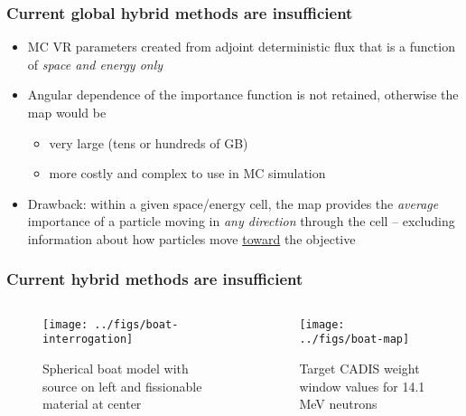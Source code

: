 \documentclass[xcolor=x11names,compress]{beamer}
\renewcommand{\(}{\begin{columns}}
\renewcommand{\)}{\end{columns}}
\newcommand{\<}[1]{\begin{column}{#1}}
\renewcommand{\>}{\end{column}}
\begin{document}
\begin{frame}[fragile]
  \frametitle{Current global hybrid methods are insufficient}

	\begin{itemize}
	\item MC VR parameters created from adjoint deterministic flux that is a function of \emph{space and energy only}
	\item Angular dependence of the importance function is not retained, otherwise the map would be
	  \begin{itemize}
	  \item very large (tens or hundreds of GB)
	  \item more costly and complex to use in MC simulation
      \end{itemize}	   
	\item Drawback: within a given space/energy cell, the map provides the \emph{average} importance of a particle moving in \emph{any direction} through the cell -- excluding information about how particles move \underline{toward} the objective
	\end{itemize}

\end{frame}

\begin{frame}[fragile]
  \frametitle{Current hybrid methods are insufficient}

	\begin{columns}
  	\begin{column}{0.5\textwidth}
 	 \begin{center}
 	 \begin{figure}
 	 \texttt{[image: ../figs/boat-interrogation]}  
 	 \caption{Spherical boat model with source on left and fissionable material at center}
 	 \end{figure}
 	 \end{center}
  	\end{column}
 	\begin{column}{0.5\textwidth}
 	 \begin{center}
 	 \begin{figure}
 	 \texttt{[image: ../figs/boat-map]}  
 	 \caption{Target CADIS weight window values for 14.1 MeV neutrons}
 	 \end{figure}
 	 \end{center}
  	\end{column}
	\end{columns}

\end{frame}
\end{document}
